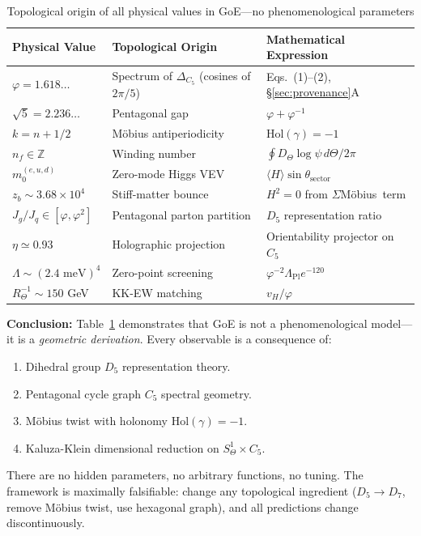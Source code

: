 \documentclass[12pt]{article}
\theoremstyle{definition}
\theoremstyle{plain}
\newcommand{\Moebius}{M\"obius}
\newcommand{\SigMoeb}{\ensuremath{\Sigma}\text{--}\Moebius}
\begin{document}
\begin{table}[H]
\centering
\caption{Topological origin of all physical values in GoE—no phenomenological parameters}
\small
\begin{tabular}{lll}
\toprule
\textbf{Physical Value} & \textbf{Topological Origin} & \textbf{Mathematical Expression} \\
\midrule
$\varphi = 1.618\ldots$ & Spectrum of $\Delta_{C_5}$ (cosines of $2\pi/5$) & Eqs.~(1)--(2), \S\ref{sec:provenance}A \\
$\sqrt{5} = 2.236\ldots$ & Pentagonal gap & $\varphi + \varphi^{-1}$ \\
$k = n + 1/2$ & M\"obius antiperiodicity & $\text{Hol}(\gamma) = -1$ \\
$n_f \in \mathbb{Z}$ & Winding number & $\oint D_\Theta \log\psi \, d\Theta / 2\pi$ \\
$m_0^{(e,u,d)}$ & Zero-mode Higgs VEV & $\langle H \rangle \sin\theta_{\text{sector}}$ \\
$z_b \sim 3.68 \times 10^4$ & Stiff-matter bounce & $H^2 = 0$ from \SigMoeb\ term \\
$J_g/J_q \in [\varphi, \varphi^2]$ & Pentagonal parton partition & $D_5$ representation ratio \\
$\eta \simeq 0.93$ & Holographic projection & Orientability projector on $C_5$ \\
$\Lambda \sim (2.4 \text{ meV})^4$ & Zero-point screening & $\varphi^{-2} \Lambda_{\text{Pl}} e^{-120}$ \\
$R_\Theta^{-1} \sim 150$ GeV & KK-EW matching & $v_H / \varphi$ \\
\bottomrule
\end{tabular}
\label{tab:moebius_dictionary}
\end{table}

\textbf{Conclusion:} Table~\ref{tab:moebius_dictionary} demonstrates that GoE is not a phenomenological model—it is a \textit{geometric derivation}. Every observable is a consequence of:
\begin{enumerate}
\item Dihedral group $D_5$ representation theory.
\item Pentagonal cycle graph $C_5$ spectral geometry.
\item M\"obius twist with holonomy $\text{Hol}(\gamma) = -1$.
\item Kaluza-Klein dimensional reduction on $S^1_\Theta \times C_5$.
\end{enumerate}

There are no hidden parameters, no arbitrary functions, no tuning. The framework is maximally falsifiable: change any topological ingredient ($D_5 \to D_7$, remove M\"obius twist, use hexagonal graph), and all predictions change discontinuously.
\end{document}
